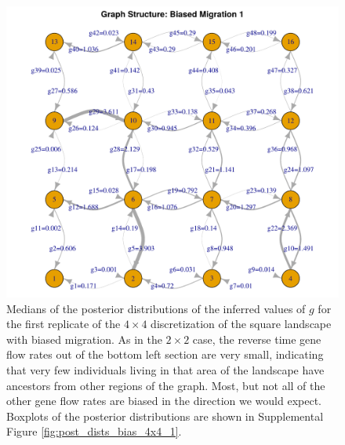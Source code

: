 \documentclass{article}
\begin{document}
\begin{figure}
\centering
 \includegraphics[scale=.8]{figs/grid_bias_4x4_1}
\caption{
    Medians of the posterior distributions of the inferred values of $g$ 
    for the first replicate of the $4 \times 4$ discretization 
    of the square landscape with biased migration.
    As in the $2 \times 2$ case, 
    the reverse time gene flow rates out of the bottom left section are very small,
    indicating that very few individuals living in that area of the landscape
    have ancestors from other regions of the graph.
    Most, but not all of the other gene flow rates are biased 
    in the direction we would expect.
    Boxplots of the posterior distributions are shown in 
    Supplemental Figure \ref{fig:post_dists_bias_4x4_1}.
    }
\label{fig:grid_bias_4x4_1}
\end{figure}
\end{document}
